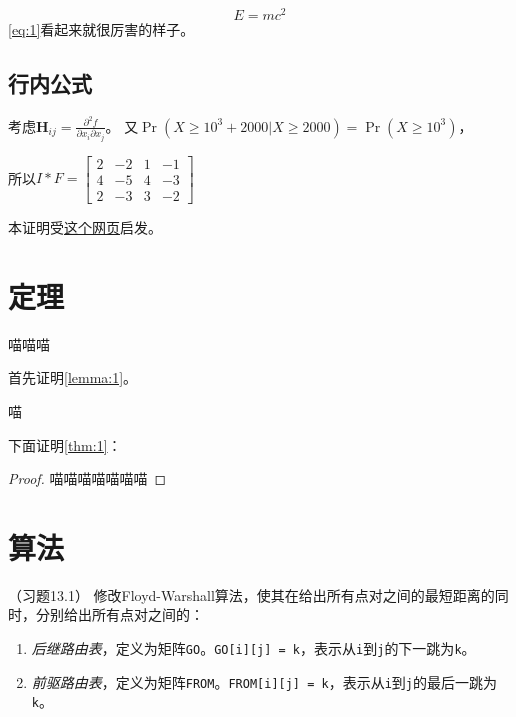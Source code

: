 \documentclass{dreamClass}
\begin{document}
\begin{equation}\label{eq:1}
    E = mc^2
\end{equation}
\cref{eq:1}看起来就很厉害的样子。

\subsection{行内公式}
考虑\(\mathbf{H}_{i j}=\frac{\partial^{2} f}{\partial x_{i} \partial x_{j}}\)。
又\(\operatorname{Pr}(X \geq 10^3 + 2000 | X \geq 2000) = \operatorname{Pr}(X \geq 10^3)\)，

所以\(I * F = \begin{bmatrix}
    2 & -2  & 1 & - 1 \\
    4 & - 5 & 4 & - 3 \\
    2 & - 3 & 3 & - 2
\end{bmatrix}\)

本证明受\href{https://datawhalechina.github.io/pumpkin-book/#/chapter2/chapter2?id=221}{这个网页}启发。

\section{定理}
\begin{theorem}\label{thm:1}
    喵喵喵
\end{theorem}

首先证明\cref{lemma:1}。
\begin{lemma}\label{lemma:1}
    喵
\end{lemma}

下面证明\cref{thm:1}：
\begin{proof}
    喵喵喵喵喵喵喵
\end{proof}


\section{算法}
\begin{problem}（习题13.1）
    修改Floyd-Warshall算法，使其在给出所有点对之间的最短距离的同时，分别给出所有点对之间的：
    \begin{enumerate}
        \item \emph{后继路由表}，定义为矩阵\texttt{GO}。\texttt{GO[i][j] = k}，表示从\texttt{i}到\texttt{j}的下一跳为\texttt{k}。
        \item \emph{前驱路由表}，定义为矩阵\texttt{FROM}。\texttt{FROM[i][j] = k}，表示从\texttt{i}到\texttt{j}的最后一跳为\texttt{k}。
    \end{enumerate}
\end{problem}
\end{document}
